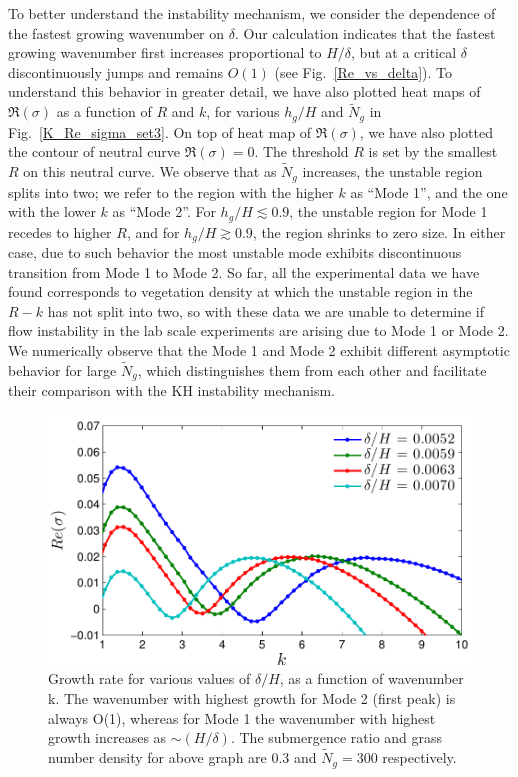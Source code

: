 \documentclass[12pt]{report}   %
\newcommand{\hg}{h_g}
\newcommand{\Rey}{{R}}
\newcommand{\Ndg}{\tilde{N}_g}
\begin{document}
To better understand the instability mechanism, we consider the dependence of the fastest growing wavenumber on $\delta$. Our calculation indicates that
the fastest growing wavenumber first increases proportional to $H/\delta$, but at a critical $\delta$ discontinuously jumps and remains $O(1)$ (see Fig.~\ref{Re_vs_delta}). 
To understand this behavior in greater detail, we have also plotted heat maps of $\Re(\sigma)$ as a function of $\Rey$ and $k$, for various $\hg/H$ and $\Ndg$ in Fig.~\ref{K_Re_sigma_set3}. On top of heat map of $\Re(\sigma)$, we have also plotted the contour of neutral curve $\Re(\sigma)=0$. The threshold $\Rey$ is set by the smallest $\Rey$ on this neutral curve. 
We observe that as $\Ndg$ increases, the unstable region splits into two; we refer to the region with the higher $k$ as ``Mode 1'', and the one with the lower $k$ as ``Mode 2''. 
For $\hg/H\lesssim 0.9$, the unstable region for Mode 1 recedes to higher $\Rey$, and for $\hg/H \gtrsim 0.9$, the region shrinks to zero size.
In either case, due to such behavior the most unstable mode exhibits discontinuous transition from Mode 1 to Mode 2.
So far, all the experimental data we have found corresponds to vegetation density at which the unstable region in the $\Rey-k$ has not split into two, so with these data we are unable to determine if flow instability in the lab scale experiments \citep{Nepf04} are arising due to Mode 1 or Mode 2. We numerically observe that the Mode 1 and Mode 2 exhibit different asymptotic behavior for large $\Ndg$, which distinguishes them from each other and facilitate their comparison with the KH instability mechanism.
\begin{figure}
 \includegraphics{K_vs_GrowthSet3}
 \caption[Growth rate for various values of $\delta/H$, as a function of wavenumber k]{Growth rate for various values of $\delta/H$, as a function of wavenumber k. The wavenumber with highest growth for Mode 2 (first peak) is always O(1), whereas for Mode 1 the wavenumber with highest growth increases as $\sim (H/\delta)$. The submergence ratio and grass number density for above graph are $0.3$ and $\Ndg = 300$ respectively.  }
 \label{K_vs_SigmaSet3}
\end{figure}
\end{document}
